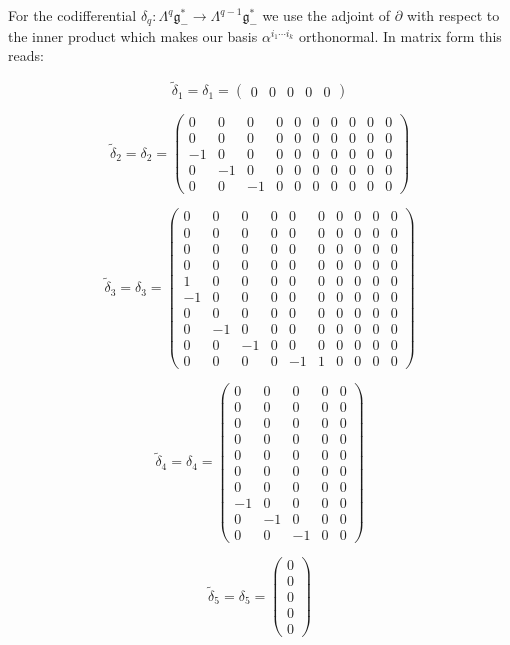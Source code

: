 \documentclass[reqno,12pt]{amsart}
\newcommand\goe{\mathfrak g}
\theoremstyle{plain}
\theoremstyle{definition}
\begin{document}
For the codifferential $\delta_q\colon\Lambda^q\goe^*_-\to\Lambda^{q-1}\goe^*_-$ we use the adjoint of $\partial$ with respect to the inner product which makes our basis $\alpha^{i_1\cdots i_k}$ orthonormal.
In matrix form this reads:

$$
\tilde\delta_1=\delta_1=\left(\begin{array}{cc|c|cc}
0&0&0&0&0
\end{array}\right)
$$

$$
\tilde\delta_2=\delta_2=\left(\begin{array}{c|cc|cccc|cc|c}
0& 0& 0& 0&0&0&0&0&0&0\\
0& 0& 0& 0&0&0&0&0&0&0\\
\hline
-1&0& 0& 0&0&0&0&0&0&0\\
\hline
0& -1&0& 0&0&0&0&0&0&0\\
0& 0& -1&0&0&0&0&0&0&0
\end{array}\right)
$$

$$
\tilde\delta_3=\delta_3=\left(\begin{array}{c|cc|cccc|cc|c}
0& 0& 0& 0&0& 0&0&0&0&0\\
\hline
0& 0& 0& 0&0& 0&0&0&0&0\\
0& 0& 0& 0&0& 0&0&0&0&0\\
\hline
0& 0& 0& 0&0& 0&0&0&0&0\\
1& 0& 0& 0&0& 0&0&0&0&0\\
-1&0& 0& 0&0& 0&0&0&0&0\\
0& 0& 0& 0&0& 0&0&0&0&0\\
\hline
0& -1&0& 0&0& 0&0&0&0&0\\
0& 0& -1&0&0& 0&0&0&0&0\\
\hline
0& 0& 0& 0&-1&1&0&0&0&0
\end{array}\right)
$$

$$
\tilde\delta_4=\delta_4=\left(\begin{array}{cc|c|cc}
0& 0& 0& 0&0\\
\hline
0& 0& 0& 0&0\\
0& 0& 0& 0&0\\
\hline
0& 0& 0& 0&0\\
0& 0& 0& 0&0\\
0& 0& 0& 0&0\\
0& 0& 0& 0&0\\
\hline
-1&0& 0& 0&0\\
0& -1&0& 0&0\\
\hline
0& 0& -1&0&0
\end{array}\right)
$$

$$
\tilde\delta_5=\delta_5=\left(\begin{array}{c}
0\\
0\\
\hline
0\\
\hline
0\\
0
\end{array}\right)
$$
\end{document}
